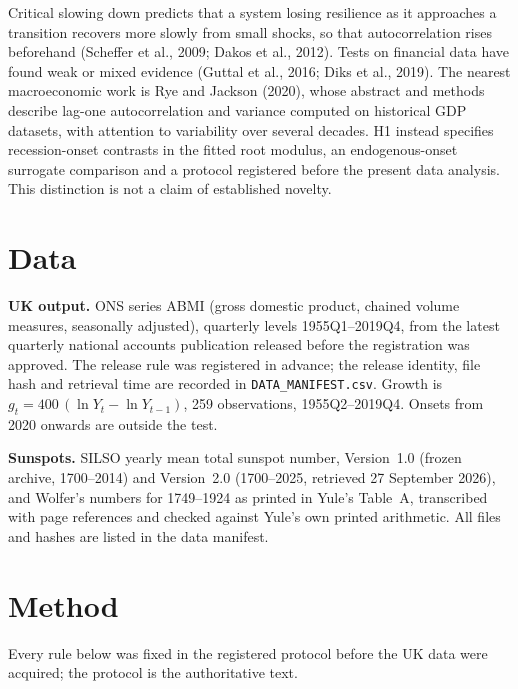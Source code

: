 \documentclass[11pt,a4paper]{article}
\begin{document}
Critical slowing down predicts that a system losing resilience as it approaches a transition recovers more slowly from small shocks, so that autocorrelation rises beforehand (Scheffer et al., 2009; Dakos et al., 2012). Tests on financial data have found weak or mixed evidence (Guttal et al., 2016; Diks et al., 2019). The nearest macroeconomic work is Rye and Jackson (2020), whose abstract and methods describe lag-one autocorrelation and variance computed on historical GDP datasets, with attention to variability over several decades. H1 instead specifies recession-onset contrasts in the fitted root modulus, an endogenous-onset surrogate comparison and a protocol registered before the present data analysis. This distinction is not a claim of established novelty.

\section{Data}

\textbf{UK output.} ONS series ABMI (gross domestic product, chained volume measures, seasonally adjusted), quarterly levels 1955Q1--2019Q4, from the latest quarterly national accounts publication released before the registration was approved. The release rule was registered in advance; the release identity, file hash and retrieval time are recorded in \texttt{DATA\_MANIFEST.csv}. \ReleaseIdentity{} Growth is $g_t = 400\,(\ln Y_t - \ln Y_{t-1})$, 259 observations, 1955Q2--2019Q4. Onsets from 2020 onwards are outside the test.

\textbf{Sunspots.} SILSO yearly mean total sunspot number, Version~1.0 (frozen archive, 1700--2014) and Version~2.0 (1700--2025, retrieved 27 September 2026), and Wolfer's numbers for 1749--1924 as printed in Yule's Table~A, transcribed with page references and checked against Yule's own printed arithmetic. All files and hashes are listed in the data manifest.

\section{Method}

Every rule below was fixed in the registered protocol before the UK data were acquired; the protocol is the authoritative text.
\end{document}
